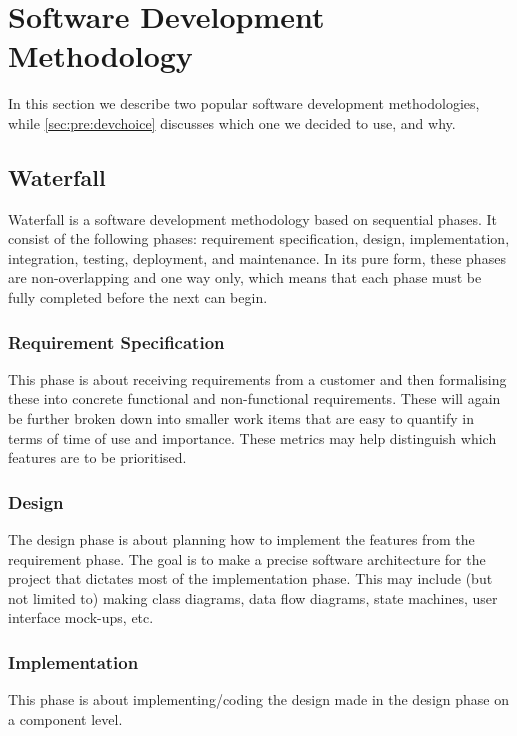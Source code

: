 \section{Software Development Methodology}
\label{sec:pre:method}
In this section we describe two popular software development methodologies,
while \autoref{sec:pre:devchoice} discusses which one we decided to use, and
why.

\subsection{Waterfall}
\label{sec:pre:waterfall}
Waterfall is a software development methodology based on sequential phases.
It consist of the following phases: requirement specification, design,
implementation, integration, testing, deployment, and maintenance. In its pure
form, these phases are non-overlapping and one way only, which means that each
phase must be fully completed before the next can begin.

\subsubsection{Requirement Specification}
This phase is about receiving requirements from a customer and then formalising
these into concrete functional and non-functional requirements. These will
again be further broken down into smaller work items that are easy to quantify
in terms of time of use and importance. These metrics may help distinguish
which features are to be prioritised.

\subsubsection{Design}
The design phase is about planning how to implement the features from the
requirement phase. The goal is to make a precise software architecture for the
project that dictates most of the implementation phase. This may include (but
not limited to) making class diagrams, data flow diagrams, state machines, user
interface mock-ups, etc.

\subsubsection{Implementation}
This phase is about implementing/coding the design made in the design phase on
a component level.

